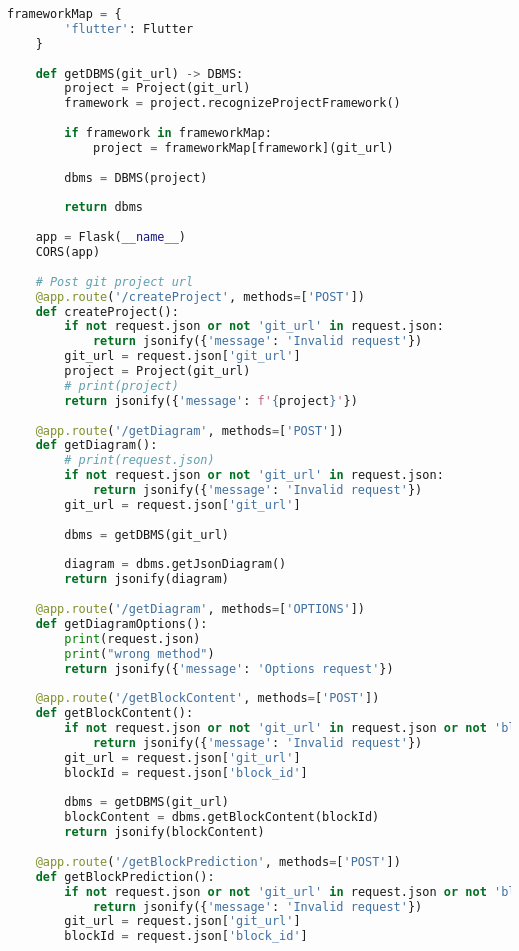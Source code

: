\begin{lstlisting}[language=Python, caption={$\texttt{main.py}$ file.}, label={lst:15}]
    frameworkMap = {
        'flutter': Flutter
    }
    
    def getDBMS(git_url) -> DBMS:
        project = Project(git_url)
        framework = project.recognizeProjectFramework()
        
        if framework in frameworkMap:
            project = frameworkMap[framework](git_url)
            
        dbms = DBMS(project)
        
        return dbms
    
    app = Flask(__name__)
    CORS(app)
    
    # Post git project url
    @app.route('/createProject', methods=['POST'])
    def createProject():
        if not request.json or not 'git_url' in request.json:
            return jsonify({'message': 'Invalid request'})
        git_url = request.json['git_url']
        project = Project(git_url)
        # print(project)
        return jsonify({'message': f'{project}'})
    
    @app.route('/getDiagram', methods=['POST'])
    def getDiagram():
        # print(request.json)
        if not request.json or not 'git_url' in request.json:
            return jsonify({'message': 'Invalid request'})
        git_url = request.json['git_url']
        
        dbms = getDBMS(git_url)
        
        diagram = dbms.getJsonDiagram()
        return jsonify(diagram)
    
    @app.route('/getDiagram', methods=['OPTIONS'])
    def getDiagramOptions():
        print(request.json)
        print("wrong method")
        return jsonify({'message': 'Options request'})
    
    @app.route('/getBlockContent', methods=['POST'])
    def getBlockContent():
        if not request.json or not 'git_url' in request.json or not 'block_id' in request.json:
            return jsonify({'message': 'Invalid request'})
        git_url = request.json['git_url']
        blockId = request.json['block_id']
        
        dbms = getDBMS(git_url)
        blockContent = dbms.getBlockContent(blockId)
        return jsonify(blockContent)
        
    @app.route('/getBlockPrediction', methods=['POST'])
    def getBlockPrediction():
        if not request.json or not 'git_url' in request.json or not 'block_id' in request.json:
            return jsonify({'message': 'Invalid request'})
        git_url = request.json['git_url']
        blockId = request.json['block_id']
        

\end{lstlisting}
